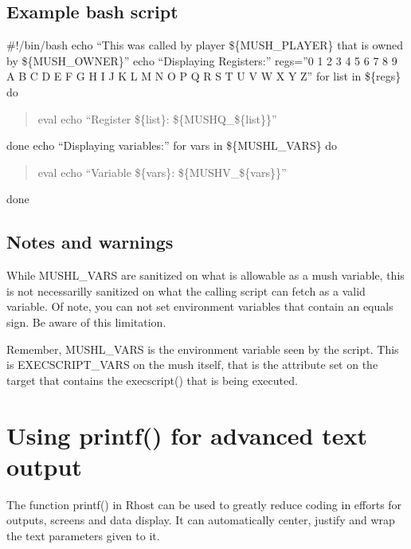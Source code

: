 \documentclass[letterpaper,10pt,english]{sphinxmanual}
\begin{document}
\section{Example bash script}
\label{\detokenize{20-execscript:example-bash-script}}
\sphinxAtStartPar
\#!/bin/bash
echo “This was called by player \$\{MUSH\_PLAYER\} that is owned by \$\{MUSH\_OWNER\}”
echo “Displaying Registers:”
regs=”0 1 2 3 4 5 6 7 8 9 A B C D E F G H I J K L M N O P Q R S T U V W X Y Z”
for list in \$\{regs\}
do
\begin{quote}

\sphinxAtStartPar
eval echo “Register \$\{list\}: \$\{MUSHQ\_\$\{list\}\}”
\end{quote}

\sphinxAtStartPar
done
echo “Displaying variables:”
for vars in \$\{MUSHL\_VARS\}
do
\begin{quote}

\sphinxAtStartPar
eval echo “Variable \$\{vars\}: \$\{MUSHV\_\$\{vars\}\}”
\end{quote}

\sphinxAtStartPar
done


\section{Notes and warnings}
\label{\detokenize{20-execscript:notes-and-warnings}}
\sphinxAtStartPar
While MUSHL\_VARS are sanitized on what is allowable as a mush variable, this
is not necessarilly sanitized on what the calling script can fetch as a valid
variable.  Of note, you can not set environment variables that contain an
equals sign.  Be aware of this limitation.

\sphinxAtStartPar
Remember, MUSHL\_VARS is the environment variable seen by the script.
This is EXECSCRIPT\_VARS on the mush itself, that is the attribute set
on the target that contains the execscript() that is being executed.


\chapter{Using printf() for advanced text output}
\label{\detokenize{21-printf:using-printf-for-advanced-text-output}}\label{\detokenize{21-printf::doc}}
\sphinxAtStartPar
The function printf() in Rhost can be used to greatly reduce coding in efforts for outputs,
screens and data display.  It can automatically center, justify and wrap the text parameters given to it.
\end{document}
